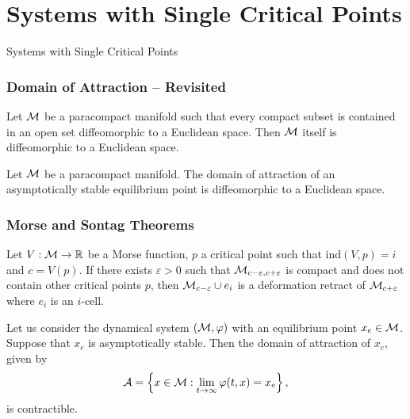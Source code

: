 \section{Systems with Single Critical Points}

\begin{frame}
    Systems with Single Critical Points


\end{frame}

\begingroup
\small

\begin{frame}
    \frametitle{Domain of Attraction -- Revisited}

    \begin{theorem}
        Let $\mathcal{M}$ be a paracompact manifold such that every compact subset is
        contained in an open set diffeomorphic to a Euclidean space. Then
        $\mathcal{M}$ itself is diffeomorphic to a Euclidean space.
    \end{theorem}

    \begin{corollary}
        Let $\mathcal{M}$ be a paracompact manifold. The domain of attraction of an
        asymptotically stable equilibrium point is diffeomorphic to a Euclidean
        space.
    \end{corollary}
\end{frame}

\begin{frame}
    \frametitle{Morse and Sontag Theorems}

    \begin{theorem}
        Let $V: \mathcal{M} \rightarrow \mathbb{R}$ be a Morse function, $p$ a
        critical point such that $\text{ind}(V, p) = i$ and $c = V(p)$. If there
        exists $\varepsilon > 0$ such that $\mathcal{M}_{c-\varepsilon,
        c+\varepsilon}$ is compact and does not contain other critical points
        $p$, then $\mathcal{M}_{c-\varepsilon} \cup e_i$ is a deformation retract of
        $\mathcal{M}_{c+\varepsilon}$ where $e_i$ is an $i$-cell.
    \end{theorem}

    \begin{theorem}
        Let us consider the dynamical system $(\mathcal{M}, \varphi)$ with an
        equilibrium point $x_e \in \mathcal{M}$. Suppose that $x_e$ is asymptotically
        stable. Then the domain of attraction of $x_e$, given by 
        \[ \mathcal{A} = \left\{ x \in \mathcal{M}: \lim_{t \rightarrow \infty} \varphi(t,
        x) = x_e \right\}, \] is contractible.
    \end{theorem}
\end{frame}


\endgroup